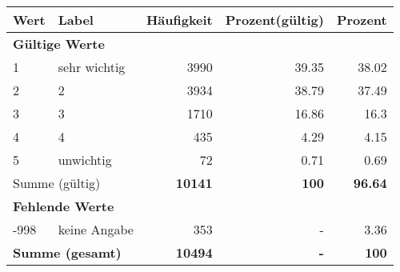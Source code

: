      \begin{longtable}{lXrrr}
     \toprule
     \textbf{Wert} & \textbf{Label} & \textbf{Häufigkeit} & \textbf{Prozent(gültig)} & \textbf{Prozent} \\
     \endhead
     \midrule
     \multicolumn{5}{l}{\textbf{Gültige Werte}}\\

     1 &
     \multicolumn{1}{X}{ sehr wichtig   } &


       \num{3990} &
       \num[round-mode=places,round-precision=2]{39.35} &
         \num[round-mode=places,round-precision=2]{38.02} \\

     2 &
     \multicolumn{1}{X}{ 2   } &


       \num{3934} &
       \num[round-mode=places,round-precision=2]{38.79} &
         \num[round-mode=places,round-precision=2]{37.49} \\

     3 &
     \multicolumn{1}{X}{ 3   } &


       \num{1710} &
       \num[round-mode=places,round-precision=2]{16.86} &
         \num[round-mode=places,round-precision=2]{16.3} \\

     4 &
     \multicolumn{1}{X}{ 4   } &


       \num{435} &
       \num[round-mode=places,round-precision=2]{4.29} &
         \num[round-mode=places,round-precision=2]{4.15} \\

     5 &
     \multicolumn{1}{X}{ unwichtig   } &


       \num{72} &
       \num[round-mode=places,round-precision=2]{0.71} &
         \num[round-mode=places,round-precision=2]{0.69} \\
     \midrule
     \multicolumn{2}{l}{Summe (gültig)} &
       \textbf{\num{10141}} &
     \textbf{\num{100}} &
       \textbf{\num[round-mode=places,round-precision=2]{96.64}} \\
     \multicolumn{5}{l}{\textbf{Fehlende Werte}}\\
       -998 &
       keine Angabe &
         \num{353} &
        - &
         \num[round-mode=places,round-precision=2]{3.36} \\
     \midrule
     \multicolumn{2}{l}{\textbf{Summe (gesamt)}} &
          \textbf{\num{10494}} &
        \textbf{-} &
        \textbf{\num{100}} \\
     \bottomrule
     \end{longtable}
     
